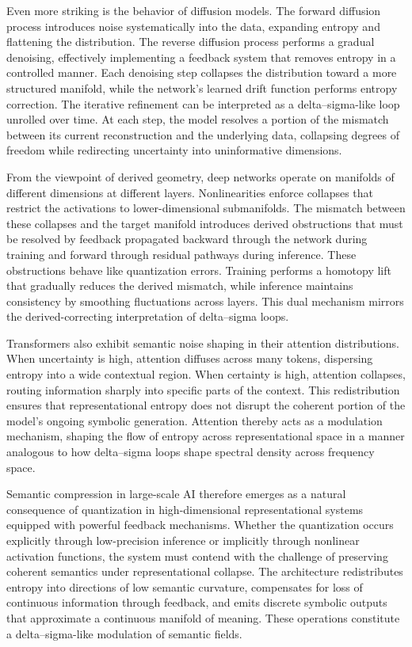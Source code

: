 Even more striking is the behavior of diffusion models. The forward diffusion process introduces noise systematically into the data, expanding entropy and flattening the distribution. The reverse diffusion process performs a gradual denoising, effectively implementing a feedback system that removes entropy in a controlled manner. Each denoising step collapses the distribution toward a more structured manifold, while the network’s learned drift function performs entropy correction. The iterative refinement can be interpreted as a delta–sigma-like loop unrolled over time. At each step, the model resolves a portion of the mismatch between its current reconstruction and the underlying data, collapsing degrees of freedom while redirecting uncertainty into uninformative dimensions.

From the viewpoint of derived geometry, deep networks operate on manifolds of different dimensions at different layers. Nonlinearities enforce collapses that restrict the activations to lower-dimensional submanifolds. The mismatch between these collapses and the target manifold introduces derived obstructions that must be resolved by feedback propagated backward through the network during training and forward through residual pathways during inference. These obstructions behave like quantization errors. Training performs a homotopy lift that gradually reduces the derived mismatch, while inference maintains consistency by smoothing fluctuations across layers. This dual mechanism mirrors the derived-correcting interpretation of delta–sigma loops.

Transformers also exhibit semantic noise shaping in their attention distributions. When uncertainty is high, attention diffuses across many tokens, dispersing entropy into a wide contextual region. When certainty is high, attention collapses, routing information sharply into specific parts of the context. This redistribution ensures that representational entropy does not disrupt the coherent portion of the model’s ongoing symbolic generation. Attention thereby acts as a modulation mechanism, shaping the flow of entropy across representational space in a manner analogous to how delta–sigma loops shape spectral density across frequency space.

Semantic compression in large-scale AI therefore emerges as a natural consequence of quantization in high-dimensional representational systems equipped with powerful feedback mechanisms. Whether the quantization occurs explicitly through low-precision inference or implicitly through nonlinear activation functions, the system must contend with the challenge of preserving coherent semantics under representational collapse. The architecture redistributes entropy into directions of low semantic curvature, compensates for loss of continuous information through feedback, and emits discrete symbolic outputs that approximate a continuous manifold of meaning. These operations constitute a delta–sigma-like modulation of semantic fields.

